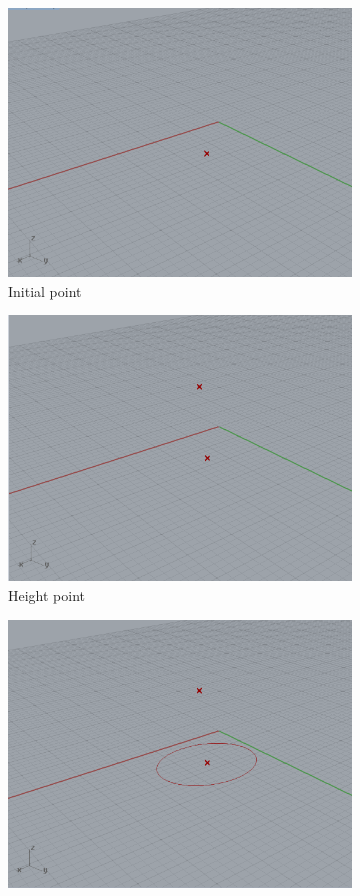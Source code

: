 \documentclass[preprint,12pt,3p]{elsarticle}
\begin{document}
\begin{figure}
\begin{subfigure}{0.3\textwidth}
  \centering
  \includegraphics[width=.9\linewidth]{a02s00.png}
  \caption{Initial point}
  \label{fig:a02s01}
\end{subfigure}%
\begin{subfigure}{0.3\textwidth}
  \centering
  \includegraphics[width=.9\linewidth]{a02s01.png}
  \caption{Height point}
  \label{fig:a02s02}
\end{subfigure}
\begin{subfigure}{0.3\textwidth}
  \centering
  \includegraphics[width=.9\linewidth]{a02s03.png}

\end{subfigure}
\end{figure}
\end{document}
